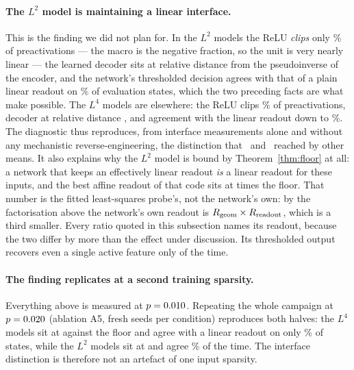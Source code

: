 \paragraph{The $L^2$ model is maintaining a linear interface.} This is the finding we did not
plan for. In the $L^2$ models the ReLU \emph{clips} only \EfiveLtwoNegPre\% of preactivations ---
the macro is the negative fraction, so the unit is very nearly linear --- the learned decoder sits at
relative distance \EfiveLtwoWoutPinvDist{} from the pseudoinverse of the encoder, and the network's
thresholded decision agrees with that of a plain linear readout on \EfiveLtwoAgreeLinear\% of
evaluation states, which the two preceding facts are what make possible. The $L^4$ models are
elsewhere: the ReLU clips \EfiveLfourNegPre\% of preactivations, decoder at relative distance
\EfiveLfourWoutPinvDist,
and agreement with the linear readout down to \EfiveLfourAgreeLinear\%. The diagnostic thus
reproduces, from interface measurements alone and without any mechanistic reverse-engineering,
the distinction that~\cite{bhagat2026cc} and~\cite{ferreiradasilva2026l4} reached by other
means. It also explains why the $L^2$ model is bound by Theorem~\ref{thm:floor} at all: a
network that keeps an effectively linear readout \emph{is} a linear readout for these inputs,
and the best affine readout of that code sits at \EfiveLtwoRatioLsMean{} times the floor. That
number is the fitted least-squares probe's, not the network's own: by the factorisation above the
network's own readout is $R_{\mathrm{geom}}\times R_{\mathrm{readout}}$, which is a third smaller. Every ratio quoted in
this subsection names its readout, because the two differ by more than the effect under discussion.
Its thresholded output recovers even a single active feature only \EfiveLtwoPmodelOne{} of the
time.

\paragraph{The finding replicates at a second training sparsity.} Everything above is measured
at $p=0.010$. Repeating the whole campaign at $p=0.020$ (ablation A5,
\EfiveSeeds{} fresh seeds per condition) reproduces both halves: the $L^4$ models sit at
\EfiveLfourSecRatioLsMean{} against the floor and agree with a linear readout on only
\EfiveLfourSecAgreeLinear\% of states, while the $L^2$ models sit at
\EfiveLtwoSecRatioLsMean{} and agree \EfiveLtwoSecAgreeLinear\% of the time. The interface
distinction is therefore not an artefact of one input sparsity.

